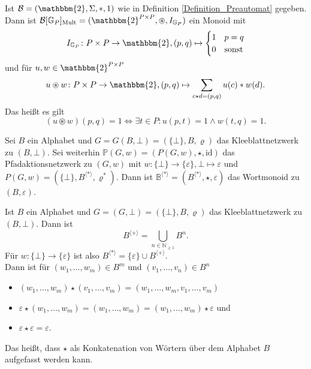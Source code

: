 \documentclass{article}
\begin{document}
\begin{remark}
  Ist $\mathcal{B} = (\mathbbm{2}, \Sigma, \ast, 1)$ wie in Definition \ref{Definition_Preautomat} gegeben.
  Dann ist $\mathcal{B}[\mathbb{G}_P]_\text{Mult} = (\mathbbm{2}^{P \times P}, \circledast, I_{\mathbb{G}_P})$
  ein Monoid mit
  \begin{equation*}
    I_{\mathbb{G}_P} \colon P \times P \to \mathbbm{2}, (p, q) \mapsto
    \begin{cases}
      1 & p = q \\
      0 & \text{sonst}
    \end{cases}
  \end{equation*}
  und für $u, w \in \mathbbm{2}^{P \times P}$
  \begin{equation*}
    u \circledast w \colon P \times P \to \mathbbm{2}, (p, q) \mapsto
    \sum_{c \star d = (p, q)} u(c) \ast w(d).
  \end{equation*}
  Das heißt es gilt
  \begin{equation*}
    (u \circledast w)(p, q) = 1 \iff \exists t \in P \colon u(p, t) = 1 \wedge w(t, q) = 1.
  \end{equation*}
\end{remark}

\begin{definition}
  Sei $B$ ein Alphabet
  und $G = G(B, \bot) = (\{\bot\}, B, \varrho)$ das Kleeblattnetzwerk zu $(B, \bot)$.
  Sei weiterhin $\mathbb{P}(G, w) = (P(G, w), \star, \text{id})$ das Pfadaktionsnetzwerk
  zu $(G, w)$
  mit $w \colon \{\bot\} \to \{\varepsilon\}, \bot \mapsto \varepsilon$
  und $P(G, w) = (\{\bot\}, B^{\langle \ast \rangle}, \varrho^\ast)$.
  Dann ist $\mathbb{B}^{\langle \ast \rangle} = (B^{\langle \ast \rangle}, \star, \varepsilon)$
  das Wortmonoid zu $(B, \varepsilon)$.
\end{definition}

\begin{remark}
  Ist $B$ ein Alphabet und $G = (G, \bot) = (\{\bot\}, B, \varrho)$
  das Kleeblattnetzwerk zu $(B, \bot)$.
  Dann ist
  \begin{equation*}
    B^{\langle + \rangle} = \bigcup_{n \in \mathbb{N}_{\geq 1}} B^n.
  \end{equation*}
  Für $w \colon \{\bot\} \to \{\varepsilon\}$
  ist also $B^{\langle \ast \rangle} = \{\varepsilon\} \cup B^{\langle + \rangle}$. \\
  Dann ist für $(w_1, \dots, w_m) \in B^m$ und $(v_1, \dots, v_n) \in B^n$
  \begin{itemize}
    \item $(w_1, \dots, w_m) \star (v_1, \dots, v_m) = (w_1, \dots, w_m, v_1, \dots, v_m)$
    \item $\varepsilon \star (w_1, \dots, w_m) = (w_1, \dots, w_m) = (w_1, \dots, w_m) \star \varepsilon$ und
    \item $\varepsilon \star \varepsilon = \varepsilon.$
  \end{itemize}
  Das heißt, dass $\star$ als Konkatenation von Wörtern über dem Alphabet $B$ aufgefasst werden kann.
\end{remark}
\end{document}

